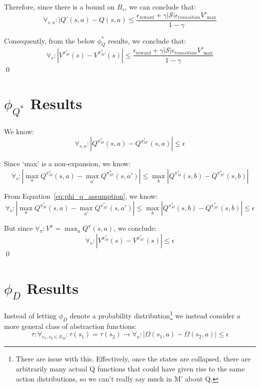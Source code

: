 \documentclass[11pt]{amsart}
\begin{document}
Therefore, since there is a bound on $B_s$, we can conclude that:
\begin{equation}
\forall_{s,a} : |Q'(s,a) - Q(s,a) \leq \frac{{\epsilon_{\text{reward}}} + \gamma |\mathcal{S}|\epsilon_{transition}V'_{\text{max}}}{1-\gamma}
\end{equation}

Consequently, from the below $\phi_Q^*$ results, we conclude that:
\begin{equation}
\forall_s : |V^{\pi^*_M}(s) - V^{\pi^*_{M'}}(s)| \leq \frac{{\epsilon_{\text{reward}}} + \gamma |\mathcal{S}|\epsilon_{transition}V'_{\text{max}}}{1-\gamma}
\end{equation}
\qed


\newpage
\section{$\phi_{Q^*}$ Results}

We know:
\begin{equation}
\forall_{s,a} : | Q^{\pi^*_M}(s,a) - Q^{\pi^*_{M'}}(s,a)| \leq \epsilon
\label{eq:phi_q_assumption}
\end{equation}

Since `max' is a non-expansion, we know:
\begin{equation}
\forall_s : |\max_a Q^{\pi^*_M}(s,a) - \max_{a'} Q^{\pi^*_{M'}}(s,a')| \leq \max_b | Q^{\pi^*_M}(s,b) - Q^{\pi^*_{M'}}(s,b)|
\end{equation}

From Equation~\ref{eq:phi_q_assumption}, we know:
\begin{equation}
\forall_s : |\max_a Q^{\pi^*_M}(s,a) - \max_{a'} Q^{\pi^*_{M'}}(s,a')| \leq \max_b | Q^{\pi^*_M}(s,b) - Q^{\pi^*_{M'}}(s,b)| \leq \epsilon
\end{equation}

But since $\forall_\pi : V^{\pi} = \max_a Q^\pi(s,a)$, we conclude:
\begin{equation}
\forall_s : |V^{\pi^*_M}(s) - V^{\pi^*_{M'}}(s)| \leq \epsilon
\end{equation}
\qed

\newpage
\section{$\phi_{D}$ Results}

Instead of letting $\phi_D$ denote a probability distribution\footnote{There are issue with this. Effectively, once the states are collapsed, there are arbitrarily many actual Q functions that could have given rise to the same action distributions, so we can't really say much in M' about Q.} we instead consider a more general class of abstraction functions:
\begin{equation}
\tau : \forall_{s_1,s_2 \in \mathcal{S}_M} : \tau(s_1) = \tau(s_2) \rightarrow \forall_a : | \Omega(s_1,a) - \Omega(s_2,a) | \leq \epsilon
\end{equation}
\end{document}

